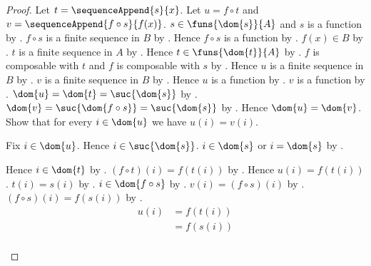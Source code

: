 \begin{proof}
    Let $t=\sequenceAppend{s}{x}$.
    Let $u=f\circ t$ and $v=\sequenceAppend{f\circ s}{f(x)}$.
    $s\in\funs{\dom{s}}{A}$ and $s$ is a function
        by .
    $f\circ s$ is a finite sequence in $B$ by
        .
    Hence $f\circ s$ is a function by
        .
    $f(x)\in B$ by .
    $t$ is a finite sequence in $A$ by
        .
    Hence $t\in\funs{\dom{t}}{A}$ by
        .
    $f$ is composable with $t$ and $f$ is composable with $s$ by
        .
    Hence $u$ is a finite sequence in $B$ by
        .
    $v$ is a finite sequence in $B$ by
        .
    Hence $u$ is a function by
        .
    $v$ is a function by
        .
    $\dom{u}=\dom{t}=\suc{\dom{s}}$ by
        .
    $\dom{v}=\suc{\dom{f\circ s}}=\suc{\dom{s}}$ by
        .
    Hence $\dom{u}=\dom{v}$.
    Show that for every $i\in\dom{u}$ we have $u(i)=v(i)$.
    \begin{subproof}
        Fix $i\in\dom{u}$.
        Hence $i\in\suc{\dom{s}}$.
        $i\in\dom{s}$ or $i=\dom{s}$ by .
        \begin{byCase}
            Hence $i\in\dom{t}$ by
                .
            $(f\circ t)(i)=f(t(i))$ by
                .
            Hence $u(i)=f(t(i))$.
            $t(i)=s(i)$ by .
            $i\in\dom{f\circ s}$ by
                .
            $v(i)=(f\circ s)(i)$ by
                .
            $(f\circ s)(i)=f(s(i))$ by
                .
            \begin{align*}
                u(i)
                    &= f(t(i))
                    \\
                    &= f(s(i))
                    \\

\end{align*}
\end{byCase}
\end{subproof}
\end{proof}
